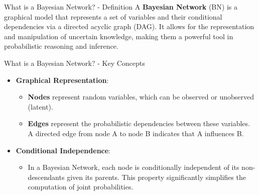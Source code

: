\documentclass[aspectratio=169]{beamer}
\begin{document}
\begin{frame}[fragile]{What is a Bayesian Network? - Definition}
    A \textbf{Bayesian Network} (BN) is a graphical model that represents a set of variables and their conditional dependencies via a directed acyclic graph (DAG). It allows for the representation and manipulation of uncertain knowledge, making them a powerful tool in probabilistic reasoning and inference.
\end{frame}

\begin{frame}[fragile]{What is a Bayesian Network? - Key Concepts}
    \begin{itemize}
        \item \textbf{Graphical Representation}: 
            \begin{itemize}
                \item \textbf{Nodes} represent random variables, which can be observed or unobserved (latent).
                \item \textbf{Edges} represent the probabilistic dependencies between these variables. A directed edge from node A to node B indicates that A influences B.
            \end{itemize}
        \item \textbf{Conditional Independence}: 
            \begin{itemize}
                \item In a Bayesian Network, each node is conditionally independent of its non-descendants given its parents. This property significantly simplifies the computation of joint probabilities.
            \end{itemize}
    \end{itemize}
\end{frame}
\end{document}
